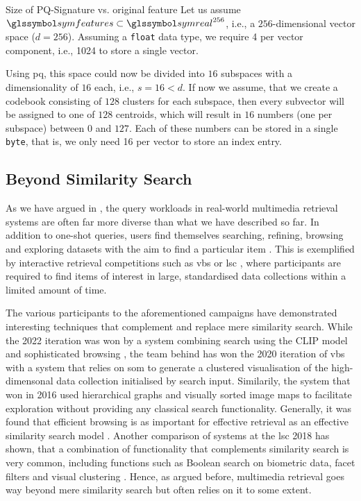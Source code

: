 \begin{example}[label=example:pq_compression]{Size of PQ-Signature vs. original feature}{}
    Let us assume $\symfeatures \subset \symreal^{256}$, i.e., a $256$-dimensional vector space ($d = 256$). Assuming a \texttt{float} data type, we require \SI{4}{\byte} per vector component, i.e., \SI{1024}{\byte} to store a single vector.
    
    Using \acrshort{pq}, this space could now be divided into $16$ subspaces with a dimensionality of $16$ each, i.e., $s = 16 < d$. If now we assume, that we create a codebook consisting of $128$ clusters for each subspace, then every subvector will be assigned to one of $128$ centroids, which will result in $16$ numbers (one per subspace) between $0$ and $127$. Each of these numbers can be stored in a single \texttt{byte}, that is, we only need \SI{16}{\byte} per vector to store an index entry.
\end{example}

\subsection{Beyond Similarity Search}
As we have argued in , the query workloads in real-world multimedia retrieval systems are often far more diverse than what we have described so far. In addition to one-shot queries, users find themselves searching, refining, browsing and exploring datasets with the aim to find a particular item \cite{Lokovc:2019Interactive,Rossetto:2020Interactive}. This is exemplified by interactive retrieval competitions such as \acrshort{vbs} \cite{Schoeffmann:2019Video,Lokovc:2018Influential} or \acrshort{lsc} \cite{Gurrin:2021Introduction}, where participants are required to find items of interest in large, standardised data collections \cite{Berns:2019V3C1,Rossetto:2021Insights} within a limited amount of time.

The various participants to the aforementioned campaigns have demonstrated interesting techniques that complement and replace mere similarity search. While the 2022 iteration was won by a system combining search using the CLIP model \cite{Radford:2021Learning} and sophisticated browsing \cite{Hezel:2022Efficient}, the team behind \cite{Kratochvil:2020SOM} has won the 2020 iteration of \acrshort{vbs} with a system that relies on \acrfull{som} \cite{Kohonen:1990Self} to generate a clustered visualisation of the high-dimensonal data collection initialised by search input. Similarily, the system that won in 2016 used \cite{Barthel:2016Navigating} hierarchical graphs and visually sorted image maps to facilitate exploration without providing any classical search functionality. Generally, it was found that efficient browsing is as important for effective retrieval as an effective similarity search model \cite{Lokovc:2019Interactive}. Another comparison of systems at the \acrshort{lsc} 2018 has shown, that a combination of functionality that complements similarity search is very common, including functions such as Boolean search on biometric data, facet filters and visual clustering \cite{Gurrin:2019Invited}. Hence, as argued before, multimedia retrieval goes way beyond mere similarity search but often relies on it to some extent.